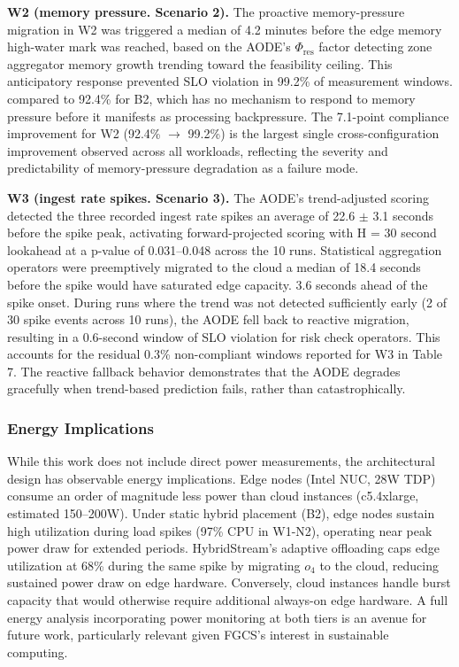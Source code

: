 \documentclass[preprint,review,12pt]{elsarticle}
\begin{document}
\textbf{W2 (memory pressure. Scenario 2).} The proactive memory-pressure migration in W2 was triggered a median of 4.2 minutes before the edge memory high-water mark was reached, based on the AODE's $\Phi_{\text{res}}$ factor detecting zone aggregator memory growth trending toward the feasibility ceiling. This anticipatory response prevented SLO violation in 99.2\% of measurement windows. compared to 92.4\% for B2, which has no mechanism to respond to memory pressure before it manifests as processing backpressure. The 7.1-point compliance improvement for W2 (92.4\% $\to$ 99.2\%) is the largest single cross-configuration improvement observed across all workloads, reflecting the severity and predictability of memory-pressure degradation as a failure mode.

\textbf{W3 (ingest rate spikes. Scenario 3).} The AODE's trend-adjusted scoring detected the three recorded ingest rate spikes an average of 22.6 $\pm$ 3.1 seconds before the spike peak, activating forward-projected scoring with H = 30 second lookahead at a p-value of 0.031--0.048 across the 10 runs. Statistical aggregation operators were preemptively migrated to the cloud a median of 18.4 seconds before the spike would have saturated edge capacity. 3.6 seconds ahead of the spike onset. During runs where the trend was not detected sufficiently early (2 of 30 spike events across 10 runs), the AODE fell back to reactive migration, resulting in a 0.6-second window of SLO violation for risk check operators. This accounts for the residual 0.3\% non-compliant windows reported for W3 in Table 7. The reactive fallback behavior demonstrates that the AODE degrades gracefully when trend-based prediction fails, rather than catastrophically.


\subsubsection{Energy Implications}

While this work does not include direct power measurements, the architectural design has observable energy implications. Edge nodes (Intel NUC, 28W TDP) consume an order of magnitude less power than cloud instances (c5.4xlarge, estimated 150--200W). Under static hybrid placement (B2), edge nodes sustain high utilization during load spikes (97\% CPU in W1-N2), operating near peak power draw for extended periods. HybridStream's adaptive offloading caps edge utilization at 68\% during the same spike by migrating $o_4$ to the cloud, reducing sustained power draw on edge hardware. Conversely, cloud instances handle burst capacity that would otherwise require additional always-on edge hardware. A full energy analysis incorporating power monitoring at both tiers is an avenue for future work, particularly relevant given FGCS's interest in sustainable computing.
\end{document}
